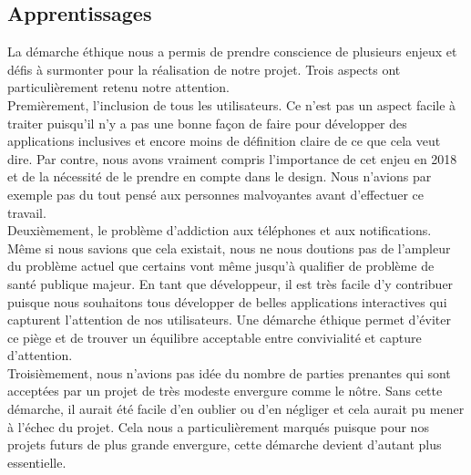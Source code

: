 \pagebreak
\subsection{Apprentissages}
La démarche éthique nous a permis de prendre conscience de plusieurs enjeux et défis à surmonter pour la réalisation de notre projet. Trois aspects ont particulièrement retenu notre attention. \\

Premièrement, l'inclusion de tous les utilisateurs. Ce n'est pas un aspect facile à traiter puisqu'il n'y a pas une bonne façon de faire pour développer des applications inclusives et encore moins de définition claire de ce que cela veut dire. Par contre, nous avons vraiment compris l'importance de cet enjeu en 2018 et de la nécessité de le prendre en compte dans le design. Nous n'avions par exemple pas du tout pensé aux personnes malvoyantes avant d'effectuer ce travail. \\

Deuxièmement, le problème d'addiction aux téléphones et aux notifications. Même si nous savions que cela existait, nous ne nous doutions pas de l'ampleur du problème actuel que certains vont même jusqu'à qualifier de problème de santé publique majeur. En tant que développeur, il est très facile d'y contribuer puisque nous souhaitons tous développer de belles applications interactives qui capturent l'attention de nos utilisateurs. Une démarche éthique permet d'éviter ce piège et de trouver un équilibre acceptable entre convivialité et capture d'attention. \\

Troisièmement, nous n'avions pas idée du nombre de parties prenantes qui sont acceptées par un projet de très modeste envergure comme le nôtre.  Sans cette démarche, il aurait été facile d'en oublier ou d'en négliger et cela aurait pu mener à l'échec du projet. Cela nous a particulièrement marqués puisque pour nos projets futurs de plus grande envergure, cette démarche devient d'autant plus essentielle.

